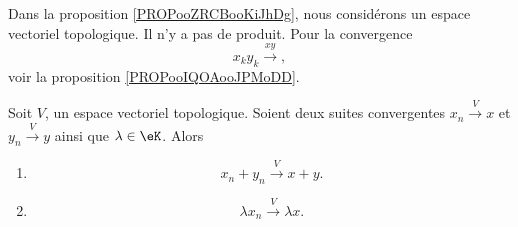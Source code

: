Dans la proposition \ref{PROPooZRCBooKiJhDg}, nous considérons un espace vectoriel topologique. Il n'y a pas de produit. Pour la convergence
\begin{equation}
	x_ky_k\stackrel{ xy}{\longrightarrow},
\end{equation}
voir la proposition \ref{PROPooIQOAooJPMoDD}.

\begin{proposition}        \label{PROPooZRCBooKiJhDg}
	Soit \( V\), un espace vectoriel topologique. Soient deux suites convergentes \( x_n\stackrel{V}{\longrightarrow}x\) et \( y_n\stackrel{V}{\longrightarrow}y\) ainsi que \( \lambda\in \eK\). Alors
	\begin{enumerate}
		\item       \label{ITEMooSHPAooQyEkgT}
		      \begin{equation}
			      x_n+y_n\stackrel{V}{\longrightarrow}x+y.
		      \end{equation}
		\item   \label{ITEMooYHHYooYATzWE}
		      \begin{equation}
			      \lambda x_n\stackrel{V}{\longrightarrow}\lambda x.
		      \end{equation}
	\end{enumerate}
\end{proposition}

